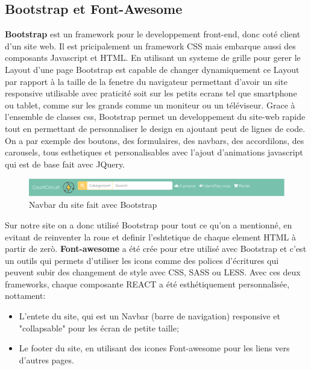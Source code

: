 \documentclass[a4paper,12pt]{report}
\theoremstyle{break}
\theoremstyle{break}
\theoremstyle{break}
\theoremstyle{break}
\theoremstyle{definition}
\theoremstyle{remark}
\begin{document}
\subsection{Bootstrap et Font-Awesome}
\textbf{Bootstrap} est un framework pour le developpement front-end, donc coté client d'un site web.
Il est pricipalement un framework CSS mais embarque aussi des composants Javascript et HTML.
En utilisant un systeme de grille pour gerer le Layout d'une page Bootstrap est capable de changer dynamiquement
ce Layout par rapport à la taille de la fenetre du navigateur permettant d'avoir un site responsive utilisable
avec praticité soit sur les petits ecrans tel que smartphone ou tablet, comme sur les grands comme un moniteur ou un téléviseur.
Grace à l'ensemble de classes css, Bootstrap permet un developpement du site-web rapide tout en permettant de personnaliser le design
en ajoutant peut de lignes de code. On a par exemple des boutons, des formulaires, des navbars,
des accordilons, des carousels, tous esthetiques et personalisables avec l'ajout d'animations javascript qui est de base fait avec
JQuery.
\begin{figure}[!ht]
  \centering
  \includegraphics[scale=0.4]{images/bootstrap.png}
  \caption{Navbar du site fait avec Bootstrap}
\end{figure}
Sur notre site on a donc utilisé Bootstrap pour tout ce qu'on a mentionné, en evitant de reinventer la roue et definir
l'eshtetique de chaque element HTML à partir de zerò.
\textbf{Font-awesome} a été crée pour etre utilisé avec Bootstrap et c'est un outils qui permets d'utiliser les icons comme des polices d'écritures
qui peuvent subir des changement de style avec CSS, SASS ou LESS.
Avec ces deux frameworks, chaque composante REACT a été esthétiquement personnalisée, nottament:
\begin{itemize}
  \item L'entete du site, qui est un Navbar (barre de navigation) responsive et "collapsable" pour les écran de petite taille;
  \item Le footer du site, en utilisant des icones Font-awesome pour les liens vers d'autres pages.
\end{itemize}
\end{document}
